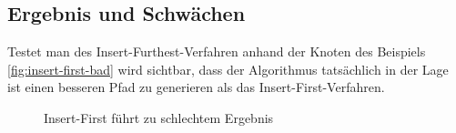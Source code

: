 \subsection{Ergebnis und Schwächen}
Testet man des Insert-Furthest-Verfahren anhand der Knoten des Beispiels \vref{fig:insert-first-bad} wird sichtbar, dass der Algorithmus tatsächlich in der Lage ist einen besseren Pfad zu generieren als das Insert-First-Verfahren.

\begin{figure}[H]
    \begin{center}
        \hfil
        \caption{Insert-First führt zu schlechtem Ergebnis}
        \label{fig:insert-furthest-good}
    \end{center}
\end{figure}

